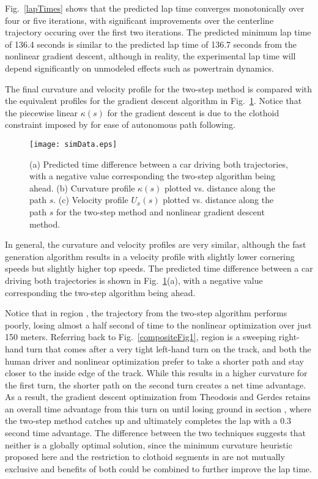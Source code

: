 Fig.~\ref{lapTimes} shows that the predicted lap time converges monotonically over four or five iterations, with significant 
improvements over the centerline trajectory occuring over the first two iterations. The predicted minimum lap time of 136.4 seconds
is similar to the predicted lap time of 136.7 seconds from the nonlinear gradient descent, 
although in reality, the experimental lap time will depend significantly on unmodeled effects such 
as powertrain dynamics.  

The final curvature and velocity profile for the two-step  method is compared with the equivalent profiles for the gradient
descent algorithm in Fig.~\ref{fig:simData}. Notice that the piecewise linear $\kappa(s)$ for the gradient descent
 is due to the clothoid constraint imposed by \cite{theodosis} for ease of autonomous path following. 

 \begin{figure}[tb]
\centering
\texttt{[image: simData.eps]}
\caption[Simulation results of fast generation algorithm]{(a) Predicted time difference between a car driving both trajectories, with a negative
value corresponding the two-step algorithm being ahead. (b) Curvature profile $\kappa(s)$ plotted vs. distance along the path $s$.
 (c) Velocity profile $U_x(s)$ plotted 
vs. distance along the path $s$ for the two-step method and nonlinear gradient descent method.}
\label{fig:simData}
\end{figure} 
\newpage
In general, the curvature and velocity profiles are very similar, although the fast generation algorithm results in a velocity profile
with slightly lower cornering speeds but slightly higher top speeds.
The predicted time difference between a car driving both trajectories 
is shown in Fig.~\ref{fig:simData}(a), with a negative
value corresponding the two-step algorithm being ahead. 

Notice that in region , the trajectory from the two-step algorithm performs
poorly, losing almost a half second of time to the nonlinear optimization over just 150 meters. Referring back to Fig.~\ref{compositeFig1}, 
region  is a sweeping right-hand turn that comes after a very tight left-hand turn on the track, and both the human driver
and nonlinear optimization prefer to take a shorter path and stay closer to the inside edge of the track. While this results in a higher
curvature for the first turn, the shorter path on the second turn creates a net time advantage. As a result, the gradient descent optimization from Theodosis
and Gerdes \cite{theodosis} retains an overall time advantage from this turn
on until losing ground in section , where the two-step method catches up and ultimately completes the lap with a 0.3 second time advantage. 
The difference between the two techniques suggests that neither is a globally optimal solution, since the minimum curvature heuristic proposed here and the restriction
to clothoid segments in \cite{theodosis} are not mutually exclusive and benefits of both could be combined to further improve the lap time. 

